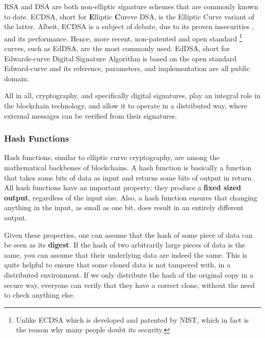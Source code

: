 RSA and DSA are both non-elliptic signature schemes that are commonly known to date. ECDSA, short
for \textbf{E}lliptic \textbf{C}ureve DSA, is the Elliptic Curve variant of the latter. Albeit,
ECDSA is a subject of debate, due to its proven insecurities \cite{brumleyRemoteTimingAttacks2011},
and its performance. Hence, more recent, non-patented and open standard \footnote{Unlike ECDSA which
is developed and patented by NIST, which in fact is the reason why many people doubt its security.}
curves, such as EdDSA, are the most commonly used. EdDSA, short for Edwards-curve Digital Signature
Algorithm is based on the open standard Edward-curve and its reference, parameters, and
implementation are all public domain.

All in all, cryptography, and specifically digital signatures, play an integral role in the
blockchain technology, and allow it to operate in a distributed way, where external messages can be
verified from their signatures.

\subsubsection{Hash Functions} \label{chap_bg:subsec:hash}

Hash functions, similar to elliptic curve cryptography, are among the mathematical backbones of
blockchains. A hash function is basically a function that takes some bits of data as input and
returns some bits of output in return. All hash functions have an important property: they produce a
\textbf{fixed sized output}, regardless of the input size. Also, a hash function ensures that
changing anything in the input, as small as one bit, does result in an entirely different output.

Given these properties, one can assume that the hash of some piece of data can be seen as its
\textbf{digest}. If the hash of two arbitrarily large pieces of data is the same, you can assume
that their underlying data are indeed the same. This is quite helpful to ensure that some cloned
data is not tampered with, in a distributed environment. If we only distribute the hash of the
original copy in a secure way, everyone can verify that they have a correct clone, without the need
to check anything else.

